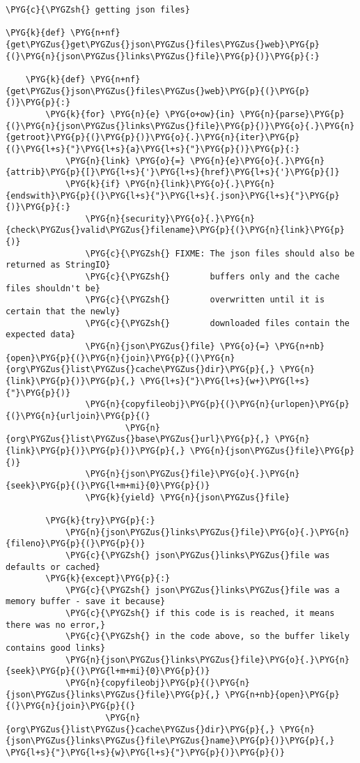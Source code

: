 \begin{Verbatim}[commandchars=\\\{\}]
\PYG{c}{\PYGZsh{} getting json files}

\PYG{k}{def} \PYG{n+nf}{get\PYGZus{}get\PYGZus{}json\PYGZus{}files\PYGZus{}web}\PYG{p}{(}\PYG{n}{json\PYGZus{}links\PYGZus{}file}\PYG{p}{)}\PYG{p}{:}

    \PYG{k}{def} \PYG{n+nf}{get\PYGZus{}json\PYGZus{}files\PYGZus{}web}\PYG{p}{(}\PYG{p}{)}\PYG{p}{:}
        \PYG{k}{for} \PYG{n}{e} \PYG{o+ow}{in} \PYG{n}{parse}\PYG{p}{(}\PYG{n}{json\PYGZus{}links\PYGZus{}file}\PYG{p}{)}\PYG{o}{.}\PYG{n}{getroot}\PYG{p}{(}\PYG{p}{)}\PYG{o}{.}\PYG{n}{iter}\PYG{p}{(}\PYG{l+s}{"}\PYG{l+s}{a}\PYG{l+s}{"}\PYG{p}{)}\PYG{p}{:}
            \PYG{n}{link} \PYG{o}{=} \PYG{n}{e}\PYG{o}{.}\PYG{n}{attrib}\PYG{p}{[}\PYG{l+s}{'}\PYG{l+s}{href}\PYG{l+s}{'}\PYG{p}{]}
            \PYG{k}{if} \PYG{n}{link}\PYG{o}{.}\PYG{n}{endswith}\PYG{p}{(}\PYG{l+s}{"}\PYG{l+s}{.json}\PYG{l+s}{"}\PYG{p}{)}\PYG{p}{:}
                \PYG{n}{security}\PYG{o}{.}\PYG{n}{check\PYGZus{}valid\PYGZus{}filename}\PYG{p}{(}\PYG{n}{link}\PYG{p}{)}
                \PYG{c}{\PYGZsh{} FIXME: The json files should also be returned as StringIO}
                \PYG{c}{\PYGZsh{}        buffers only and the cache files shouldn't be}
                \PYG{c}{\PYGZsh{}        overwritten until it is certain that the newly}
                \PYG{c}{\PYGZsh{}        downloaded files contain the expected data}
                \PYG{n}{json\PYGZus{}file} \PYG{o}{=} \PYG{n+nb}{open}\PYG{p}{(}\PYG{n}{join}\PYG{p}{(}\PYG{n}{org\PYGZus{}list\PYGZus{}cache\PYGZus{}dir}\PYG{p}{,} \PYG{n}{link}\PYG{p}{)}\PYG{p}{,} \PYG{l+s}{"}\PYG{l+s}{w+}\PYG{l+s}{"}\PYG{p}{)}
                \PYG{n}{copyfileobj}\PYG{p}{(}\PYG{n}{urlopen}\PYG{p}{(}\PYG{n}{urljoin}\PYG{p}{(}
                        \PYG{n}{org\PYGZus{}list\PYGZus{}base\PYGZus{}url}\PYG{p}{,} \PYG{n}{link}\PYG{p}{)}\PYG{p}{)}\PYG{p}{,} \PYG{n}{json\PYGZus{}file}\PYG{p}{)}
                \PYG{n}{json\PYGZus{}file}\PYG{o}{.}\PYG{n}{seek}\PYG{p}{(}\PYG{l+m+mi}{0}\PYG{p}{)}
                \PYG{k}{yield} \PYG{n}{json\PYGZus{}file}

        \PYG{k}{try}\PYG{p}{:}
            \PYG{n}{json\PYGZus{}links\PYGZus{}file}\PYG{o}{.}\PYG{n}{fileno}\PYG{p}{(}\PYG{p}{)}
            \PYG{c}{\PYGZsh{} json\PYGZus{}links\PYGZus{}file was defaults or cached}
        \PYG{k}{except}\PYG{p}{:}
            \PYG{c}{\PYGZsh{} json\PYGZus{}links\PYGZus{}file was a memory buffer - save it because}
            \PYG{c}{\PYGZsh{} if this code is is reached, it means there was no error,}
            \PYG{c}{\PYGZsh{} in the code above, so the buffer likely contains good links}
            \PYG{n}{json\PYGZus{}links\PYGZus{}file}\PYG{o}{.}\PYG{n}{seek}\PYG{p}{(}\PYG{l+m+mi}{0}\PYG{p}{)}
            \PYG{n}{copyfileobj}\PYG{p}{(}\PYG{n}{json\PYGZus{}links\PYGZus{}file}\PYG{p}{,} \PYG{n+nb}{open}\PYG{p}{(}\PYG{n}{join}\PYG{p}{(}
                    \PYG{n}{org\PYGZus{}list\PYGZus{}cache\PYGZus{}dir}\PYG{p}{,} \PYG{n}{json\PYGZus{}links\PYGZus{}file\PYGZus{}name}\PYG{p}{)}\PYG{p}{,} \PYG{l+s}{"}\PYG{l+s}{w}\PYG{l+s}{"}\PYG{p}{)}\PYG{p}{)}


\end{Verbatim}
